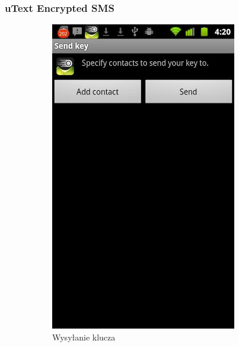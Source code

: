 \documentclass[xcolor=table]{beamer}
\begin{document}
\begin{frame}
  \frametitle{uText Encrypted SMS}
    \begin{center}
        \begin{figure}
          \centering
            \begin{subfigure}[b]{0.4\textwidth}
               \centering
               \includegraphics[width=\textwidth]{uText1}
              \caption{Wysyłanie klucza}
            \end{subfigure}
            \quad
             \begin{subfigure}[b]{0.4\textwidth}
              \centering

\end{subfigure}
\end{figure}
\end{center}
\end{frame}
\end{document}
